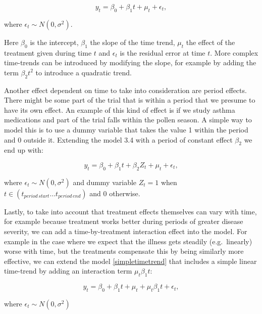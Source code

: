 \documentclass[12pt,a4paper,leqno]{report}
\theoremstyle{plain}
\theoremstyle{definition}
\theoremstyle{remark}
\begin{document}
\begin{def}\label{}
    \begin{equation}\label{simpletimetrend}
        y_t = \beta_0 + \beta_1 t + \mu_t + \epsilon_t,
    \end{equation}
\end{def}where \(\epsilon_t \sim N(0,\sigma^2)\).

Here \(\beta_0\) is the intercept, \(\beta_1\) the slope of the time trend, \(\mu_t\) the
effect of the treatment given during time \(t\) and \(\epsilon_t\) is the residual error at time \(t\).
More complex time-trends can be introduced by modifying the slope, for example by adding the term
\(\beta_2 t^2\) to introduce a quadratic trend.

Another effect dependent on time to take into consideration are period effects.
There might be some part of the trial that is within a period that we presume to
have its own effect. An example of this kind of effect is if we study asthma
medications and part of the trial falls within the pollen season. A simple way to model this
is to use a dummy variable that takes the value 1 within the period and 0 outside it.
Extending the model 3.4 with a period of constant effect \(\beta_2\) we end up with:

\begin{def}\label{}
    \begin{equation}\label{}
        y_t = \beta_0 + \beta_1 t + \beta_{2}Z_t + \mu_t + \epsilon_t,
    \end{equation}
\end{def}where \(\epsilon_t \sim N(0,\sigma^2)\) and dummy variable \(Z_t = 1\)
when \(t \in (t_{period\,start} \ldots t_{period\,end}) \) and \(0\) otherwise.

Lastly, to take into account that treatment effects themselves can vary with time, for example because
treatment works better during periods of greater disease severity, we can add a time-by-treatment
interaction effect into the model. For example in the case where we expect that the
illness gets steadily (e.g.\ linearly) worse with time, but the treatments compensate this
by being similarly more effective, we can extend the model \ref{simpletimetrend} that
includes a simple linear time-trend by adding an interaction term \(\mu_t\beta_1 t\):

\begin{def}\label{}
    \begin{equation}\label{}
        y_t = \beta_0 + \beta_1 t + \mu_t + \mu_t\beta_1 t + \epsilon_t,
    \end{equation}
\end{def}where \(\epsilon_t \sim N(0,\sigma^2)\)
\end{document}
